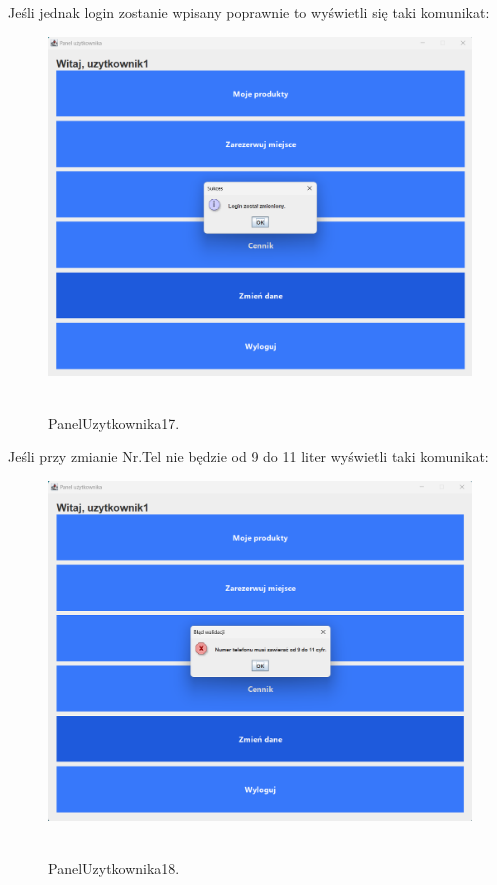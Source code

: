 Jeśli jednak login zostanie wpisany poprawnie to wyświetli się taki komunikat:

\begin{figure}[H]
    \centering
    \includegraphics[width=.9\linewidth]{figures/PanelUzytkownika17.png}\
    \caption{PanelUzytkownika17.\label{PanelUzytkownika17}}
\end{figure}

Jeśli przy zmianie Nr.Tel nie będzie od 9 do 11 liter wyświetli taki komunikat:

\begin{figure}[H]
    \centering
    \includegraphics[width=.9\linewidth]{figures/PanelUzytkownika18.png}\
    \caption{PanelUzytkownika18.\label{PanelUzytkownika18}}
\end{figure}

